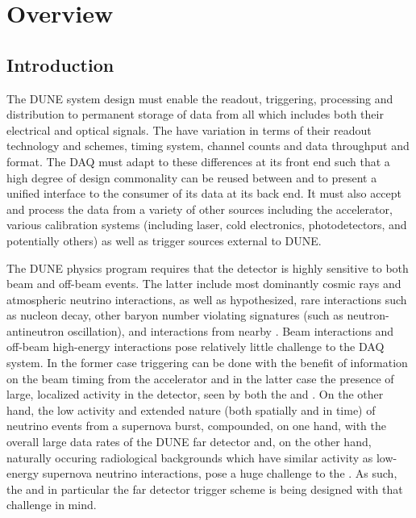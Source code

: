 \section{Overview}
\label{sec:fd-daq-ov}


\subsection{Introduction}
\label{sec:fd-daq-intro}

The DUNE   system design must enable the
readout, triggering, processing and distribution to permanent storage
of data from all  which includes both their
electrical  and optical  signals. 
The  have variation in terms of their readout
technology and schemes, timing system, channel counts and data
throughput and format. 
The DAQ must adapt to these differences at its front end such that a
high degree of design commonality can be reused between
 and to present a unified interface to the consumer
of its data at its back end.
It must also accept and process the data from a variety of other
sources including the accelerator, various calibration systems
(including laser, cold electronics, photodetectors, and potentially
others) as well as trigger sources external to DUNE.  

The DUNE physics program requires that the detector is highly
sensitive to both beam and off-beam events.
The latter include most dominantly cosmic rays and atmospheric
neutrino interactions, as well as hypothesized, rare interactions such
as nucleon decay, other baryon number violating signatures (such as
neutron-antineutron oscillation), and interactions from nearby
. 
Beam interactions and off-beam high-energy interactions pose
relatively little challenge to the DAQ system.
In the former case triggering can be done with the benefit of
information on the beam timing from the accelerator and in the latter
case the presence of large, localized activity in the detector, seen
by both the  and . 
On the other hand, the low activity and extended nature (both
spatially and in time) of neutrino events from a supernova burst,
compounded, on one hand, with the overall large data rates of the DUNE
far detector and, on the other hand, naturally occuring radiological
backgrounds which have similar activity as low-energy supernova
neutrino interactions, pose a huge challenge to the .
As such, the  and in particular the far detector trigger
scheme is being designed with that challenge in mind. 

